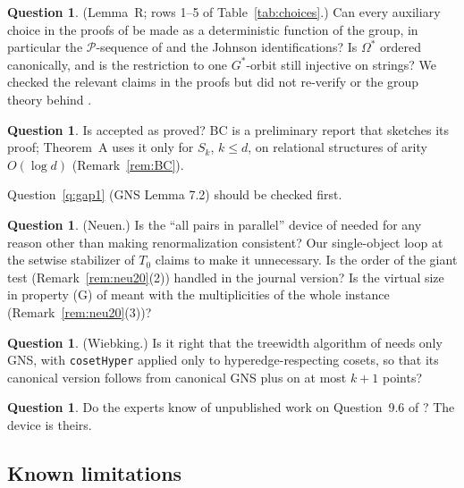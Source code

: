 \documentclass[11pt]{article}
\theoremstyle{plain}
\theoremstyle{definition}
\newtheorem{question}[theorem]{Question}
\theoremstyle{remark}
\theoremstyle{named}
\theoremstyle{namedrm}
\begin{document}
\begin{question}\label{q:changeofaction}
(Lemma~R; rows 1--5 of Table~\ref{tab:choices}.) Can every auxiliary choice in the proofs of
\cite[Thms.~4.3, 4.6]{GNS} be made as a deterministic function of the group, in particular the
$\mathcal P$-sequence of \cite[Thm.~3.13]{GNS} and the Johnson identifications? Is $\Omega^*$ ordered canonically,
and is the restriction to one $G^*$-orbit still injective on strings? We checked the relevant claims in the
proofs but did not re-verify \cite[Thm.~3.13]{GNS} or the group theory behind \cite[Lemma~4.5]{GNS}.
\end{question}

\begin{question}\label{q:BC}
Is \cite[Thm.~2.2]{Bab19} accepted as proved? BC is a preliminary report that sketches its proof; Theorem~A
uses it only for $S_k$, $k\le d$, on relational structures of arity $O(\log d)$ (Remark~\ref{rem:BC}).
\end{question}

Question~\ref{q:gap1} (GNS Lemma 7.2) should be checked first.

\begin{question}
(Neuen.) Is the ``all pairs in parallel'' device of \cite{Neu20} needed for any reason other than making
renormalization consistent? Our single-object loop at the setwise stabilizer of $T_0$ claims to make it
unnecessary. Is the order of the giant test (Remark~\ref{rem:neu20}(2)) handled in the journal version? Is the virtual size in property (G) of \cite[Thm.~4.17]{Neu20} meant with the multiplicities of the whole instance (Remark~\ref{rem:neu20}(3))?
\end{question}

\begin{question}
(Wiebking.) Is it right that the treewidth algorithm of \cite{Wie20} needs only GNS, with \texttt{cosetHyper}
applied only to hyperedge-respecting cosets, so that its canonical version follows from canonical GNS plus
\cite[Thm.~9, Cor.~27]{Wie20} on at most $k+1$ points?
\end{question}

\begin{question}
Do the experts know of unpublished work on Question~9.6 of \cite{Wie21}? The device is theirs.
\end{question}

\subsection{Known limitations}
\end{document}
